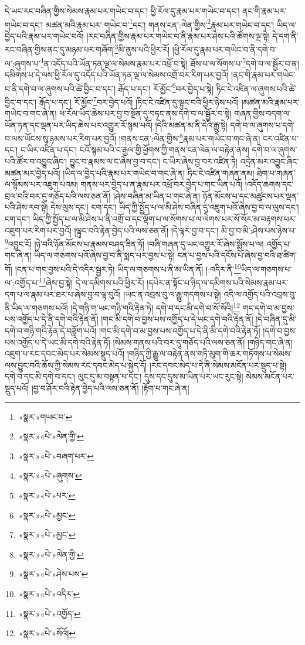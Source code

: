 དེ་ཡང་རང་བཞིན་གྱིས་སེམས་རྣམ་པར་གཡེང་བ་དང་། ཕྱི་རོལ་དུ་རྣམ་པར་གཡེང་བ་དང་། ནང་གི་རྣམ་པར་གཡེང་བ་དང་། མཚན་མའི་རྣམ་པར་:གཡེང་བ་\footnote{«སྣར་»གཡང་བ་}དང་། གནས་ངན་:ལེན་གྱིས་\footnote{«སྣར་»«པེ་»ལེན་གྱི་}རྣམ་པར་གཡེང་བ་དང་། ཡིད་ལ་བྱེད་པའི་རྣམ་པར་གཡེང་བའོ། །རང་བཞིན་གྱིས་རྣམ་པར་གཡེང་བ་ནི་རྣམ་པར་ཤེས་པའི་ཚོགས་ལྔ་སྟེ། དེ་དག་ནི་རང་བཞིན་གྱིས་ནང་དུ་མཉམ་པར་གཞོག་\footnote{«སྣར་»«པེ་»བཞག་པར་}མི་ནུས་པའི་ཕྱིར་རོ། །ཕྱི་རོལ་དུ་རྣམ་པར་གཡེང་བ་ནི་དགེ་བ་ལ་:ཞུགས་པ་\footnote{«སྣར་»«པེ་»ཞུགས་}ན་འདོད་པའི་ཡོན་ཏན་ལྔ་ལ་སེམས་རྣམ་པར་འཕྲོ་བ་སྟེ། ཐོས་པ་ལ་སོགས་པ་\footnote{«སྣར་»«པེ་»པར་}དགེ་བ་ལ་སྦྱོར་བ་ན། དམིགས་པ་དེ་ལས་ཕྱི་རོལ་དུ་འདོད་པའི་ཡོན་ཏན་ལྔ་ལ་སེམས་འགྲོ་བར་རིག་པར་བྱའོ། །ནང་གི་རྣམ་པར་གཡེང་བ་ནི་དགེ་བ་ལ་ཞུགས་པའི་ཚེ་བྱིང་བ་དང་། རྒོད་པ་དང་། རོ་མྱོང་\footnote{«སྣར་»«པེ་»མྱང་}བར་བྱེད་པ་སྟེ། ཏིང་ངེ་འཛིན་ལ་ཞུགས་པའི་ཚེ་བྱིང་བ་དང་། རྒོད་པ་དང་། རོ་མྱོང་\footnote{«སྣར་»«པེ་»མྱང་}བར་བྱེད་པའོ། །ཏིང་ངེ་འཛིན་དུ་ལྟུང་བའི་ཕྱིར་ཉེས་པའོ། །མཚན་མའི་རྣམ་པར་གཡེང་བ་གང་ཞེ་ན། ཕ་རོལ་ཡིད་ཆེས་པར་བྱ་བ་སྔོན་དུ་བཏང་ནས་དགེ་བ་ལ་སྦྱོར་བ་སྟེ། གཞན་གྱིས་བདག་ལ་ཡོན་ཏན་དང་ལྡན་པར་ཡིད་ཆེས་པར་འགྱུར་རོ་སྙམ་པའོ། །དེའི་མཚན་མ་ནི་དེའི་རྒྱུ་སྟེ། དགེ་བ་ལ་ཞུགས་པ་དགེ་བ་ལས་ཡོངས་སུ་ཉམས་པར་རིག་པར་བྱའོ། །གནས་ངན་:ལེན་གྱིས་\footnote{«སྣར་»«པེ་»ལེན་གྱི་}རྣམ་པར་གཡེང་བ་གང་ཞེ་ན། ངར་འཛིན་པ་དང་། ང་ཡིར་འཛིན་པ་དང་། ངའོ་སྙམ་པའི་ང་རྒྱལ་གྱི་ཕྱོགས་ཀྱི་གནས་ངན་ལེན་ལ་བརྟེན་ནས། དགེ་བ་ལ་ཞུགས་པའི་ཚོར་བ་འབྱུང་ཞིང་། བྱུང་བ་རྣམས་ལ་ང་ཞེས་བྱ་བ་དང་། ང་ཡིར་ཞེས་བྱ་བར་འཛིན་ཏེ། འདྲེན་མར་འབྱུང་ཞིང་མཚན་མར་བྱེད་པའོ། །ཡིད་ལ་བྱེད་པའི་རྣམ་པར་གཡེང་བ་གང་ཞེ་ན། ཏིང་ངེ་འཛིན་གཞན་ནམ། ཐེག་པ་གཞན་ལ་སྙོམས་པར་འཇུག་པའམ། གནས་པར་བྱེད་པ་ན་རྣམ་པར་འཕྲོ་བར་བྱེད་པ་གང་ཡིན་པའོ། །འདོད་ཆགས་དང་བྲལ་བའི་བར་དུ་གཅོད་པའི་ལས་ཅན་ནོ། །ཤེས་བཞིན་མ་ཡིན་པ་གང་ཞེ་ན། ཉོན་མོངས་པ་དང་མཚུངས་པར་ལྡན་པའི་ཤེས་རབ་སྟེ། དེས་ལུས་དང་། ངག་དང་། ཡིད་ཀྱི་སྤྱོད་པ་ལ་མི་ཤེས་བཞིན་དུ་འཇུག་པའོ་ཞེས་བྱ་བ་ལ་ལུས་དང་། ངག་དང་། ཡིད་ཀྱི་སྤྱོད་པ་ལ་མི་ཤེས་པ་ནི་འགྲོ་བ་དང་ལྡོག་པ་ལ་སོགས་པ་ལ་ལེགས་པར་སོ་སོར་མ་བརྟགས་པར་འཇུག་པར་རིག་པར་བྱའོ། །ལྟུང་བའི་རྟེན་བྱེད་པའི་ལས་ཅན་ནོ། །དེ་ལྟར་བྱ་བ་དང་། མི་བྱ་བ་མི་:ཤེས་པས་ཉེས་པ་\footnote{«སྣར་»«པེ་»ཤེས་པས་}འབྱུང་ངོ། །ཉེ་བའི་ཉོན་མོངས་པ་རྣམས་བཤད་ཟིན་ཏོ། །བཞི་གཞན་དུ་ཡང་འགྱུར་རོ་ཞེས་སྨོས་པ་ལ། འགྱོད་པ་གང་ཞེ་ན། ཡིད་ལ་གཅགས་པའོ་ཞེས་བྱ་བ་ནི་སྨད་པར་བྱས་པ་སྟེ། ངན་པ་བྱས་པའི་དངོས་པོ་ཞེས་བྱ་བའི་ཐ་ཚིག་གོ། །ངན་པ་གང་བྱས་པའི་དེ་འདིར་སྦྱར་ཏེ། ཡིད་ལ་གཅགས་པ་ནི་མ་ཡིན་ནོ། །:འདིར་ནི་\footnote{«སྣར་»«པེ་»འདིར་}ཡིད་ལ་གཅགས་པ་ལ་:འགྱོད་པ་\footnote{«སྣར་»«པེ་»འགྱོད་}ཞེས་བྱ་སྟེ། དེ་ལ་དམིགས་པའི་ཕྱིར་རོ། །དཔེར་ན་སྟོང་པ་ཉིད་ལ་དམིགས་པའི་སེམས་རྣམ་པར་དག་པ་ལ་རྣམ་པར་ཐར་པ་ཞེས་བྱ་བ་ལྟ་བུའོ། །ཡང་ན་འབྲས་བུ་ལ་རྒྱུ་གདགས་པ་སྟེ། འདི་ལ་འགྱོད་པའི་འབྲས་བུ་ནི་ཡིད་ལ་གཅགས་པའོ། །དེ་གཉི་ག་ཡང་གཉི་གའི་རྟེན་ཏེ། དགེ་བ་དང་མི་དགེ་བ་སོ་སོའི།\footnote{«སྣར་»«པེ་»སོའོ།} གང་དགེ་བ་མ་བྱས་པས་འགྱོད་པ་དེ་ནི་དགེ་བའི་རྟེན་ནོ། །གང་མི་དགེ་བ་བྱས་པས་འགྱོད་པ་དེ་ཡང་དགེ་བའི་རྟེན་ནོ། །དེ་བཞིན་དུ་མི་དགེ་བ་གཉི་གའི་རྟེན་དེ་བཟློག་པའོ། །གང་མི་དགེ་བ་མ་བྱས་པས་འགྱོད་པ་དེ་ནི་མི་དགེ་བའི་རྟེན་ཏོ། །དགེ་བ་བྱས་པས་འགྱོད་པ་དེ་ཡང་མི་དགེ་བའི་རྟེན་ཏོ། །སེམས་གནས་པའི་བར་དུ་གཅོད་པའི་ལས་ཅན་ནོ། །གཉིད་གང་ཞེ་ན། འཇུག་པ་རང་དབང་མེད་པར་སེམས་སྡུད་པའོ། །གཉིད་ཀྱི་རྒྱུ་ལ་བརྟེན་ནས་གཏི་མུག་གི་ཆར་གཏོགས་པ་སེམས་ལས་བྱུང་བའི་ཆོས་ཀྱི་སེམས་རང་དབང་མེད་པ་སྐྱེད་དོ། །རང་དབང་མེད་པ་དེ་ནི་སེམས་མངོན་པར་སྡུད་པ་སྟེ། དགེ་བ་དང་མི་དགེ་བ་དང་། ལུང་དུ་མ་བསྟན་པ་དང་། དུས་དང་དུས་མ་ཡིན་པར་ཡང་རུང་སྟེ། སེམས་མངོན་པར་སྡུད་པའོ། །བྱ་བ་ཤོར་བའི་རྟེན་བྱེད་པའི་ལས་ཅན་ནོ། །རྟོག་པ་གང་ཞེ་ན། 